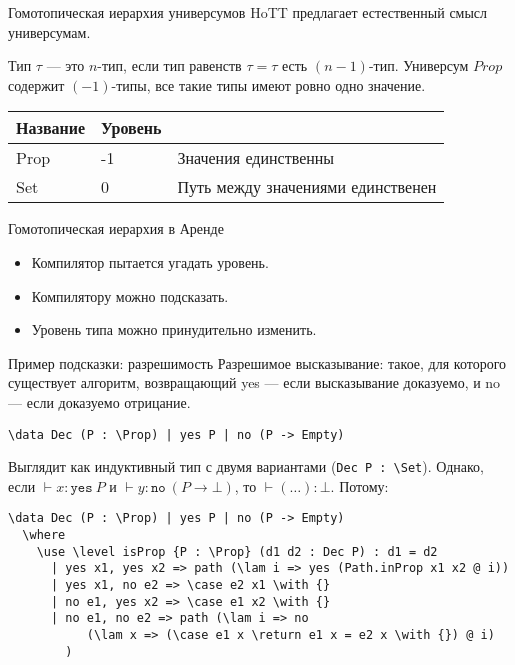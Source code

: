 \documentclass[aspectratio=169,dvipsnames,usenames]{beamer}
\begin{document}
\begin{frame}{Гомотопическая иерархия универсумов}
HoTT предлагает естественный смысл универсумам.

\begin{dfn}
Тип $\tau$ --- это $n$-тип, если тип равенств $\tau = \tau$ есть $(n-1)$-тип.
Универсум $Prop$ содержит $(-1)$-типы, все такие типы имеют ровно одно значение.
\end{dfn}

\begin{tabular}{lll}
Название & Уровень\\\hline
Prop & -1 & Значения единственны\\
Set & 0 & Путь между значениями единственен
\end{tabular}

\end{frame}

\begin{frame}{Гомотопическая иерархия в Аренде}
\begin{itemize}
\item Компилятор пытается угадать уровень.
\item Компилятору можно подсказать.
\item Уровень типа можно принудительно изменить.
\end{itemize}
\end{frame}

\begin{frame}[fragile]{Пример подсказки: разрешимость}
Разрешимое высказывание: такое, для которого 
существует алгоритм, возвращающий yes --- если высказывание
доказуемо, и no --- если доказуемо отрицание.
\small\color[HTML]{025002}
\begin{verbatim}
\data Dec (P : \Prop) | yes P | no (P -> Empty)
\end{verbatim}
\normalsize\color{black}

Выглядит как индуктивный тип с двумя вариантами (\verb!Dec P : \Set!). Однако, если
 $\vdash x : \texttt{yes}\ P$ и  $\vdash y : \texttt{no}\ (P \rightarrow \bot)$, то $\vdash (\dots) : \bot$.
Потому:

\small\color[HTML]{025002}
\begin{verbatim}
\data Dec (P : \Prop) | yes P | no (P -> Empty)
  \where
    \use \level isProp {P : \Prop} (d1 d2 : Dec P) : d1 = d2
      | yes x1, yes x2 => path (\lam i => yes (Path.inProp x1 x2 @ i))
      | yes x1, no e2 => \case e2 x1 \with {}
      | no e1, yes x2 => \case e1 x2 \with {}
      | no e1, no e2 => path (\lam i => no 
           (\lam x => (\case e1 x \return e1 x = e2 x \with {}) @ i)
        )
\end{verbatim}
\normalsize\color{black}
\end{frame}
\end{document}
